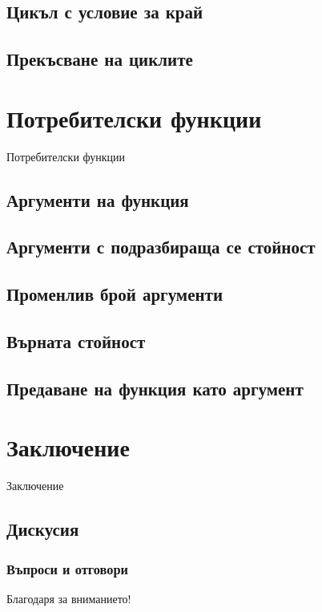 \documentclass{beamer}
\begin{document}
\subsection{Цикъл с условие за край}

\subsection{Прекъсване на циклите}

\section{Потребителски функции}

\begin{frame}
\center \huge{Потребителски функции}
\end{frame}

\subsection{Аргументи на функция}

\subsection{Аргументи с подразбираща се стойност}

\subsection{Променлив брой аргументи}

\subsection{Върната стойност}

\subsection{Предаване на функция като аргумент}

\section{Заключение}

\begin{frame}
\center \huge{Заключение}
\end{frame}

\subsection{Дискусия}

\begin{frame}
\frametitle{Въпроси и отговори}
\center \huge{Благодаря за вниманието!}
\end{frame}
\end{document}

